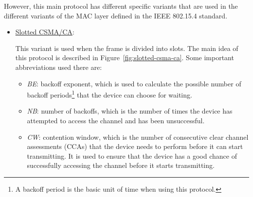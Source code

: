 However, this main protocol has different specific variants that are used in the different variants of the MAC layer defined in the IEEE 802.15.4 standard.
\begin{itemize}
    \item \ul{Slotted CSMA/CA}:
    
    This variant is used when the frame is divided into slots. The main idea of this protocol is described in Figure~\ref{fig:slotted-csma-ca}. Some important abbreviations used there are:
    \begin{itemize}
        \item \emph{BE}: backoff exponent, which is used to calculate the possible number of backoff periods\footnote{A backoff period is the basic unit of time when using this protocol.} that the device can choose for waiting.
        \item \emph{NB}: number of backoffs, which is the number of times the device has attempted to access the channel and has been unsuccessful.
        \item \emph{CW}: contention window, which is the number of consecutive clear channel assessments (CCAs) that the device needs to perform before it can start transmitting. It is used to ensure that the device has a good chance of successfully accessing the channel before it starts transmitting.
    \end{itemize}

\begin{figure}
    \centering
    \begin{tikzpicture}[
        node distance=0.5cm and 1.5cm,
        font=\small\sffamily,
        thick,
        block/.style={
            draw=black!70, 
            fill=white, 
            align=center, 
            inner sep=6pt, 
            rounded corners=2pt,
            line width=0.8pt,
            minimum width=2cm,
            drop shadow={opacity=0.2} 
        },
        main/.style={
            block,
            fill=blue!5,
            draw=blue!60!black},
        input/.style={
            block,
            fill=gray!10, dashed},
        decision/.style={
            diamond,
            draw=orange!80!black,
            fill=orange!5, 
            aspect=2,
            inner sep=2pt,
            minimum width=2.5cm, font=\footnotesize\bfseries
        },
        resultFailure/.style={
            block,
            fill=red!5,
            draw=red!60!black
        },
        resultSuccess/.style={
            block,
            fill=green!5,
            draw=green!60!black
        }
    ]


\end{tikzpicture}
\end{figure}
\end{itemize}
